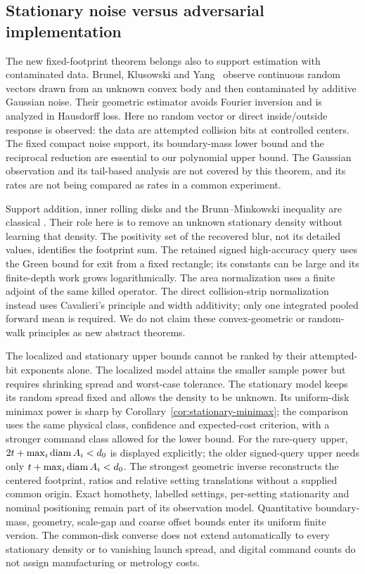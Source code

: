 \subsection{Stationary noise versus adversarial implementation}
The new fixed-footprint theorem belongs also to support estimation with
contaminated data. Brunel, Klusowski and Yang~\cite{BKY} observe
continuous random vectors drawn from an unknown convex body and then
contaminated by additive Gaussian noise. Their geometric estimator
avoids Fourier inversion and is analyzed in Hausdorff loss. Here no
random vector or direct inside/outside response is observed: the data
are attempted collision bits at controlled centers. The fixed compact
noise support, its boundary-mass lower bound and the reciprocal reduction
are essential to our polynomial upper bound. The Gaussian observation
and its tail-based analysis are not covered by this theorem, and its
rates are not being compared as rates in a common experiment.

Support addition, inner rolling disks and the Brunn--Minkowski inequality
are classical \cite{Schneider}. Their role here is to remove an unknown
stationary density without learning that density. The positivity set of
the recovered blur, not its detailed values, identifies the footprint
sum. The retained signed high-accuracy query uses the Green bound for exit from a fixed
rectangle; its constants can be large and its finite-depth work grows
logarithmically. The area normalization uses a finite adjoint of the
same killed operator. The direct collision-strip normalization instead
uses Cavalieri's principle and width additivity; only one integrated
pooled forward mean is required. We do not claim these convex-geometric
or random-walk
principles as new abstract theorems.

The localized and stationary upper bounds cannot be ranked by their
attempted-bit exponents alone. The localized model attains the smaller
sample power but requires shrinking spread and worst-case tolerance.
The stationary model keeps its random spread fixed and allows the
density to be unknown. Its uniform-disk minimax power is sharp by
Corollary~\ref{cor:stationary-minimax}; the comparison uses the same
physical class, confidence and expected-cost criterion, with a
stronger command class allowed for the lower bound. For the rare-query
upper, $2t+\max_i\operatorname{diam} A_i<d_0$ is displayed explicitly; the older
signed-query upper needs only $t+\max_i\operatorname{diam} A_i<d_0$.
The strongest geometric inverse reconstructs the centered footprint,
ratios and relative setting translations without a supplied common
origin. Exact homothety, labelled settings, per-setting stationarity
and nominal positioning remain part of its observation model.
Quantitative boundary-mass, geometry, scale-gap and coarse offset
bounds enter its uniform finite version. The common-disk converse
does not extend automatically to every stationary density or to
vanishing launch spread, and digital command counts do not assign
manufacturing or metrology costs.
